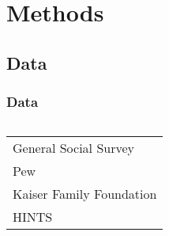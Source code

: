 \documentclass[pdf]{beamer}
\begin{document}
\section{Methods}

\subsection{Data}
\begin{frame}
\frametitle{Data}
  \begin{columns}
      \begin{tabular}{l}  %
        \hline   %
        General Social Survey           \\
        Pew                             \\
        Kaiser Family Foundation        \\
        HINTS                           \\
        \hline  %
        \end{tabular}
   \end{columns}
\end{frame}
\end{document}
